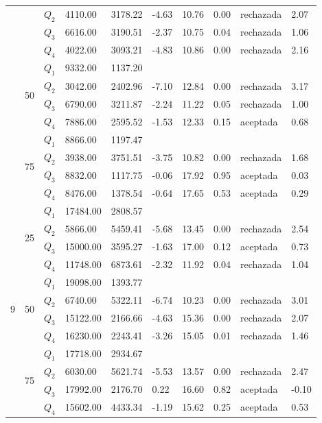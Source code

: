 \begin{table}[]
\begin{tabular}{|l|l|l|l|l|l|l|l|l|l|}
 &  & $Q_2$ & 4110.00 & 3178.22 & -4.63 & 10.76 & 0.00 & rechazada & 2.07 \\ \cline{3-10} 
 &  & $Q_3$ & 6616.00 & 3190.51 & -2.37 & 10.75 & 0.04 & rechazada & 1.06 \\ \cline{3-10} 
 &  & $Q_4$ & 4022.00 & 3093.21 & -4.83 & 10.86 & 0.00 & rechazada & 2.16 \\ \cline{2-10} 
 & \multirow{4}{*}{50} & $Q_1$ & 9332.00 & 1137.20 & \multicolumn{5}{l|}{} \\ \cline{3-10} 
 &  & $Q_2$ & 3042.00 & 2402.96 & -7.10 & 12.84 & 0.00 & rechazada & 3.17 \\ \cline{3-10} 
 &  & $Q_3$ & 6790.00 & 3211.87 & -2.24 & 11.22 & 0.05 & rechazada & 1.00 \\ \cline{3-10} 
 &  & $Q_4$ & 7886.00 & 2595.52 & -1.53 & 12.33 & 0.15 & aceptada & 0.68 \\ \cline{2-10} 
 & \multirow{4}{*}{75} & $Q_1$ & 8866.00 & 1197.47 & \multicolumn{5}{l|}{} \\ \cline{3-10} 
 &  & $Q_2$ & 3938.00 & 3751.51 & -3.75 & 10.82 & 0.00 & rechazada & 1.68 \\ \cline{3-10} 
 &  & $Q_3$ & 8832.00 & 1117.75 & -0.06 & 17.92 & 0.95 & aceptada & 0.03 \\ \cline{3-10} 
 &  & $Q_4$ & 8476.00 & 1378.54 & -0.64 & 17.65 & 0.53 & aceptada & 0.29 \\ \hline
\multirow{12}{*}{9} & \multirow{4}{*}{25} & $Q_1$ & 17484.00 & 2808.57 & \multicolumn{5}{l|}{} \\ \cline{3-10} 
 &  & $Q_2$ & 5866.00 & 5459.41 & -5.68 & 13.45 & 0.00 & rechazada & 2.54 \\ \cline{3-10} 
 &  & $Q_3$ & 15000.00 & 3595.27 & -1.63 & 17.00 & 0.12 & aceptada & 0.73 \\ \cline{3-10} 
 &  & $Q_4$ & 11748.00 & 6873.61 & -2.32 & 11.92 & 0.04 & rechazada & 1.04 \\ \cline{2-10} 
 & \multirow{4}{*}{50} & $Q_1$ & 19098.00 & 1393.77 & \multicolumn{5}{l|}{} \\ \cline{3-10} 
 &  & $Q_2$ & 6740.00 & 5322.11 & -6.74 & 10.23 & 0.00 & rechazada & 3.01 \\ \cline{3-10} 
 &  & $Q_3$ & 15122.00 & 2166.66 & -4.63 & 15.36 & 0.00 & rechazada & 2.07 \\ \cline{3-10} 
 &  & $Q_4$ & 16230.00 & 2243.41 & -3.26 & 15.05 & 0.01 & rechazada & 1.46 \\ \cline{2-10} 
 & \multirow{4}{*}{75} & $Q_1$ & 17718.00 & 2934.67 & \multicolumn{5}{l|}{} \\ \cline{3-10} 
 &  & $Q_2$ & 6030.00 & 5621.74 & -5.53 & 13.57 & 0.00 & rechazada & 2.47 \\ \cline{3-10} 
 &  & $Q_3$ & 17992.00 & 2176.70 & 0.22 & 16.60 & 0.82 & aceptada & -0.10 \\ \cline{3-10} 
 &  & $Q_4$ & 15602.00 & 4433.34 & -1.19 & 15.62 & 0.25 & aceptada & 0.53 \\ \hline
\end{tabular}
\end{table}


